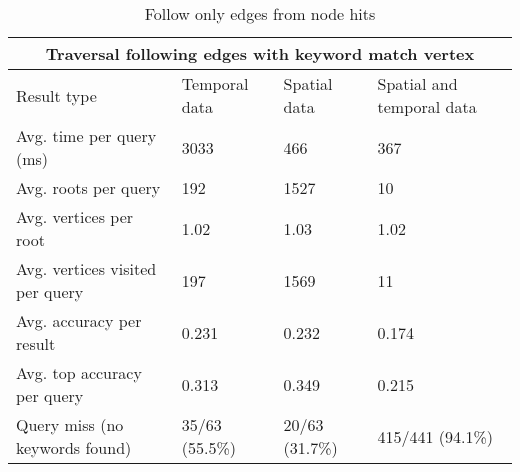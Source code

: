 \begin{table}[h]
	\caption{Follow only edges from node hits}
	\label{table:followHits}
	\begin{tabular}{ |p{3cm}||p{3cm}|p{3cm}|p{3cm}|  }
		\hline
		\multicolumn{4}{|c|}{Traversal following edges with keyword match vertex}                     \\
		\hline
		Result type                     & Temporal data  & Spatial data   & Spatial and temporal data \\
		\hline
		Avg. time per query (ms)        & 3033           & 466            & 367                       \\
		Avg. roots per query            & 192            & 1527           & 10                        \\
		Avg. vertices per root          & 1.02           & 1.03           & 1.02                      \\
		Avg. vertices visited per query & 197            & 1569           & 11                        \\
		Avg. accuracy per result        & 0.231          & 0.232          & 0.174                     \\
		Avg. top accuracy per query     & 0.313          & 0.349          & 0.215                     \\
		Query miss (no keywords found)  & 35/63 (55.5\%) & 20/63 (31.7\%) & 415/441 (94.1\%)          \\
		\hline
	\end{tabular}
\end{table}